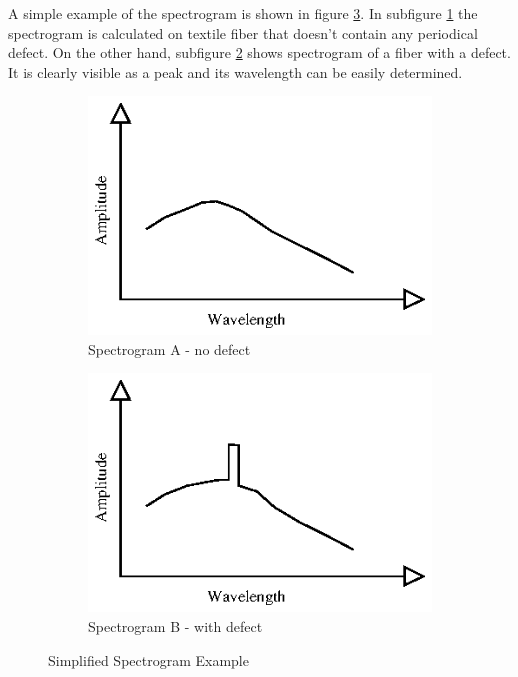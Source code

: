 \documentclass[twoside]{ctuthesis}
\theoremstyle{plain}
\theoremstyle{definition}
\theoremstyle{note}
\begin{document}
A simple example of the spectrogram is shown in figure \ref{fig:specExpl}. In subfigure \ref{fig:specExpl_A} the spectrogram is calculated on textile fiber that doesn't contain any periodical defect. On the other hand, subfigure \ref{fig:specExpl_B} shows spectrogram of a fiber with a defect. It is clearly visible as a peak and its wavelength can be easily determined.
\begin{figure}
	\centering
	\begin{subfigure}{0.5\textwidth}
		\centering
		\includegraphics[width=1.0\linewidth]{spectrogram_good.eps}
		\caption{Spectrogram A - no defect}
		\label{fig:specExpl_A}
	\end{subfigure}%
	\begin{subfigure}{0.5\textwidth}
		\centering
		\includegraphics[width=1.0\linewidth]{spectrogram_bad.eps}
		\caption{Spectrogram B - with defect}
		\label{fig:specExpl_B}
	\end{subfigure}
	\caption{Simplified Spectrogram Example}
	\label{fig:specExpl}
\end{figure}
\end{document}
